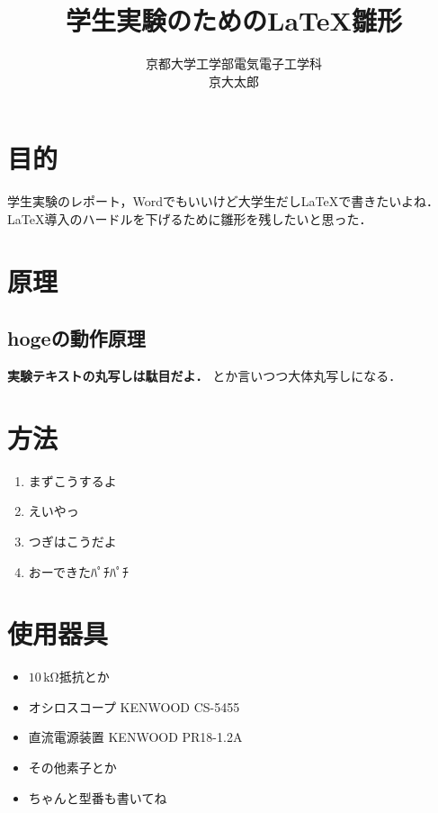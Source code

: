 \documentclass[autodetect-engine,dvipdfmx-if-dvi,ja=standard,a4paper,11pt,titlepage]{bxjsarticle}
\newcommand{\crm}[1]{\mbox{$\,\mathrm{#1}$}}
\begin{document}
\title{学生実験のための\LaTeX{}雛形}
\author{京都大学工学部電気電子工学科 \\ 京大太郎}
\maketitle
\section{目的}
学生実験のレポート，Wordでもいいけど大学生だし\LaTeX{}で書きたいよね．\\
\LaTeX{}導入のハードルを下げるために雛形を残したいと思った．
\section{原理}
\subsection{hogeの動作原理}
\label{sub:m_hoge}
{\bf 実験テキストの丸写しは駄目だよ．}
とか言いつつ大体丸写しになる．
\section{方法}
\begin{enumerate}
  \item まずこうするよ
  \item えいやっ
  \item つぎはこうだよ
  \item おーできたﾊﾟﾁﾊﾟﾁ
\end{enumerate}
\section{使用器具}
\begin{itemize}
  \item $10\crm{k\Omega}$抵抗とか
  \item オシロスコープ KENWOOD CS-5455
  \item 直流電源装置 KENWOOD PR18-1.2A
  \item その他素子とか
  \item ちゃんと型番も書いてね
\end{itemize}
\end{document}
